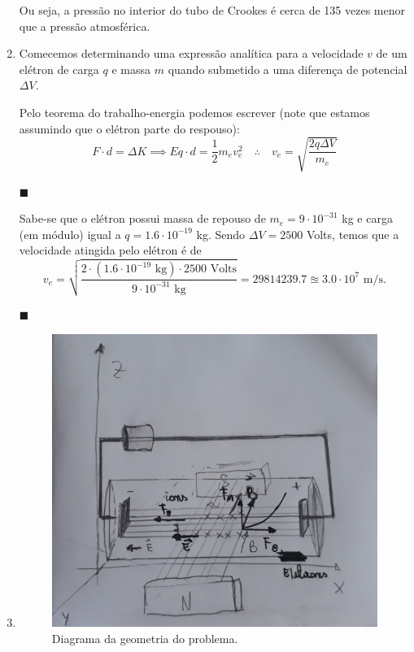 \documentclass[12pt,a4paper]{article}
\begin{document}
\begin{enumerate}
    Ou seja, a pressão no interior do tubo de Crookes é cerca de 135 vezes menor que a pressão atmosférica.



    \item Comecemos determinando uma expressão analítica para a velocidade $v$ de um elétron de carga $q$ e massa $m$ quando submetido a uma diferença de potencial $\Delta V$.

    Pelo teorema do trabalho-energia podemos escrever (note que estamos assumindo que o elétron parte do respouso):
    \begin{equation} \label{eq:e_vel}
        F\cdot d=\Delta K\implies Eq\cdot d=\frac{1}{2}m_ev_e^{2}\quad\therefore\quad\boxed{v_e=\sqrt{\frac{2q\Delta V}{m_e}}}
    \end{equation}
    \begin{flushright}
        $\blacksquare$
    \end{flushright}

    Sabe-se que o elétron possui massa de repouso de $m_e=9\cdot10^{-31}$ kg e carga (em módulo) igual a $q=1.6\cdot10^{-19}$ kg. Sendo $\Delta V=2500$ Volts, temos que a velocidade atingida pelo elétron é de
    \begin{equation}
        v_e=\sqrt{\frac{2\cdot(1.6\cdot10^{-19}\text{ kg})\cdot2500\text{ Volts}}{9\cdot10^{-31}\text{ kg}}}=29814239.7\approxeq3.0\cdot10^{7}\text{ m/s}.
    \end{equation}
    \begin{flushright}
        $\blacksquare$
    \end{flushright}



    \item 
         \begin{figure}[htp!]
            \centering
            \includegraphics[width=0.7\linewidth]{Figures/Diagram.jpeg}
            \caption{Diagrama da geometria do problema.}
            \label{fig:Diagram}
        \end{figure}
    

\end{enumerate}
\end{document}
